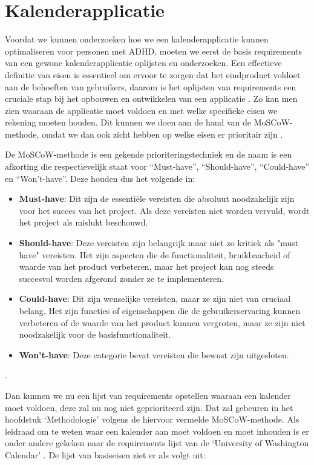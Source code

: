 \section{Kalenderapplicatie}
Voordat we kunnen onderzoeken hoe we een kalenderapplicatie kunnen optimaliseren voor personen met ADHD, moeten we eerst de basis requirements van een gewone kalenderapplicatie oplijsten en onderzoeken. Een effectieve definitie van eisen is essentieel om ervoor te zorgen dat het eindproduct voldoet aan de behoeften van gebruikers, daarom is het oplijsten van requirements een cruciale stap bij het opbouwen en ontwikkelen van een applicatie \autocite{bahill2017discovering}. Zo kan men zien waaraan de applicatie moet voldoen en met welke specifieke eisen we rekening moeten houden.  Dit kunnen we doen aan de hand van de MoSCoW-methode, omdat we dan ook zicht hebben op welke eisen er prioritair zijn \autocite{kravchenko2022ranking}. \newline

De MoSCoW-methode is een gekende prioriteringstechniek en de naam is een afkorting die respectievelijk staat voor “Must-have”, “Should-have”, “Could-have” en “Won’t-have”.  Deze houden dus het volgende in: 
\begin{itemize}[label=-]
    \item \textbf{Must-have}: Dit zijn de essentiële vereisten die absoluut noodzakelijk zijn voor het succes van het project. Als deze vereisten niet worden vervuld, wordt het project als mislukt beschouwd.
    \item \textbf{Should-have}: Deze vereisten zijn belangrijk maar niet zo kritiek als "must have" vereisten. Het zijn aspecten die de functionaliteit, bruikbaarheid of waarde van het product verbeteren, maar het project kan nog steeds succesvol worden afgerond zonder ze te implementeren.
    \item \textbf{Could-have}: Dit zijn wenselijke vereisten, maar ze zijn niet van cruciaal belang. Het zijn functies of eigenschappen die de gebruikerservaring kunnen verbeteren of de waarde van het product kunnen vergroten, maar ze zijn niet noodzakelijk voor de basisfunctionaliteit.
    \item \textbf{Won't-have}: Deze categorie bevat vereisten die bewust zijn uitgesloten.
\end{itemize} \autocite{kravchenko2022ranking}. \newline

Dan kunnen we nu een lijst van requirements opstellen waaraan een kalender moet voldoen, deze zal nu nog niet geprioriteerd zijn. Dat zal gebeuren in het hoofdstuk ‘Methodologie’ volgens de hiervoor vermelde MoSCoW-methode. Als leidraad om te weten waar een kalender aan moet voldoen en moet inhouden is er onder andere gekeken naar de requirements lijst van de ‘University of Washington Calendar’ \autocite{UW2006CALENDAR} .  De lijst van basiseisen ziet er als volgt uit:

